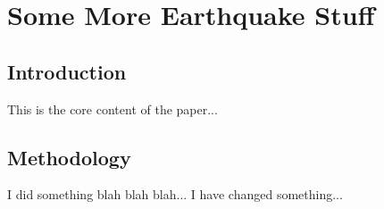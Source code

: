 \documentclass[../../main_thesis.tex]{subfiles}
\begin{document}
\chapter{Some More Earthquake Stuff} %
\label{chap:paper2}

\section{Introduction}
This is the core content of the paper...

\section{Methodology}
I did something blah blah blah...
I have changed something...
\end{document}

